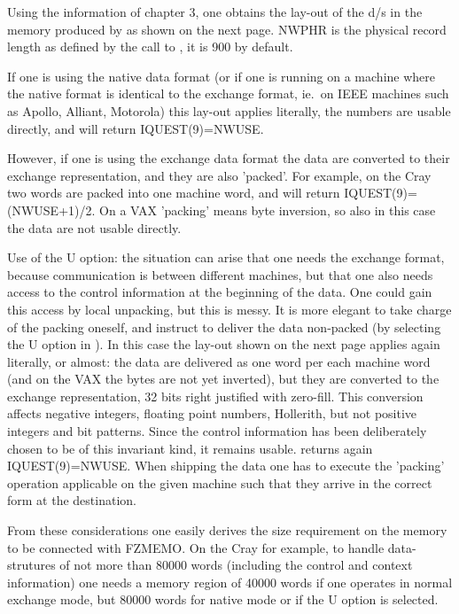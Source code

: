 {Using the information of chapter 3,
one obtains the lay-out of the d/s in the memory
produced by  as shown on the next page.
NWPHR is the physical record length as defined by the call
to , it is 900 by default.

If one is using the native data format
(or if one is running on a machine where the native format
is identical to the exchange format, ie.~on IEEE machines
such as Apollo, Alliant, Motorola)
this lay-out applies literally,
the numbers are usable directly,
and  will return IQUEST(9)=NWUSE.

However, if one is using the exchange data format
the data are converted to their exchange representation,
and they are also 'packed'.
For example, on the Cray two words are packed into one
machine word,
and  will return IQUEST(9)=(NWUSE+1)/2.
On a VAX 'packing' means byte inversion,
so also in this case the data are not usable directly.

Use of the U option:
the situation can arise that one needs the exchange format,
because communication is between different machines,
but that one also needs access to the control information
at the beginning of the data.
One could gain this access by local unpacking, but this is messy.
It is more elegant to take charge of the packing oneself,
and instruct  to deliver the data non-packed
(by selecting the U option in ).
In this case the lay-out shown on the next page
applies again literally, or almost:
the data are delivered as one word per each machine word
(and on the VAX the bytes are not yet inverted),
but they are converted to the exchange representation,
32 bits right justified with zero-fill.
This conversion affects negative integers, floating point numbers,
Hollerith, but not positive integers and bit patterns.
Since the control information has been deliberately chosen
to be of this invariant kind, it remains usable.
 returns again IQUEST(9)=NWUSE.
When shipping the data one has to execute the 'packing' operation
applicable on the given machine such that they arrive in
the correct form at the destination.

From these considerations one easily derives the size
requirement on the memory to be connected with FZMEMO.
On the Cray for example, to handle data-strutures of not more
than 80000 words (including the control and context information)
one needs a memory region of 40000 words if one operates
in normal exchange mode,
but 80000 words for native mode or if the U option is selected.

}
